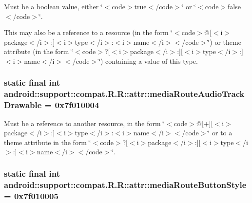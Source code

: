 Must be a boolean value, either \char`\"{}$<$code$>$true$<$/code$>$\char`\"{} or \char`\"{}$<$code$>$false$<$/code$>$\char`\"{}. 

This may also be a reference to a resource (in the form \char`\"{}$<$code$>$@\mbox{[}$<$i$>$package$<$/i$>$:\mbox{]}$<$i$>$type$<$/i$>$:$<$i$>$name$<$/i$>$$<$/code$>$\char`\"{}) or theme attribute (in the form \char`\"{}$<$code$>$?\mbox{[}$<$i$>$package$<$/i$>$:\mbox{]}\mbox{[}$<$i$>$type$<$/i$>$:\mbox{]}$<$i$>$name$<$/i$>$$<$/code$>$\char`\"{}) containing a value of this type. \hypertarget{classandroid_1_1support_1_1compat_1_1_r_1_1attr_bdf7f663003544405de036fb73947bd4}{
\subsubsection[{mediaRouteAudioTrackDrawable}]{\setlength{\rightskip}{0pt plus 5cm}static final int android::support::compat.R.R::attr::mediaRouteAudioTrackDrawable = 0x7f010004}}
\label{classandroid_1_1support_1_1compat_1_1_r_1_1attr_bdf7f663003544405de036fb73947bd4}


Must be a reference to another resource, in the form \char`\"{}$<$code$>$@\mbox{[}+\mbox{]}\mbox{[}$<$i$>$package$<$/i$>$:\mbox{]}$<$i$>$type$<$/i$>$:$<$i$>$name$<$/i$>$$<$/code$>$\char`\"{} or to a theme attribute in the form \char`\"{}$<$code$>$?\mbox{[}$<$i$>$package$<$/i$>$:\mbox{]}\mbox{[}$<$i$>$type$<$/i$>$:\mbox{]}$<$i$>$name$<$/i$>$$<$/code$>$\char`\"{}. \hypertarget{classandroid_1_1support_1_1compat_1_1_r_1_1attr_0e305c9da7520d648aff512de4b34dc4}{
\subsubsection[{mediaRouteButtonStyle}]{\setlength{\rightskip}{0pt plus 5cm}static final int android::support::compat.R.R::attr::mediaRouteButtonStyle = 0x7f010005}}
\label{classandroid_1_1support_1_1compat_1_1_r_1_1attr_0e305c9da7520d648aff512de4b34dc4}


